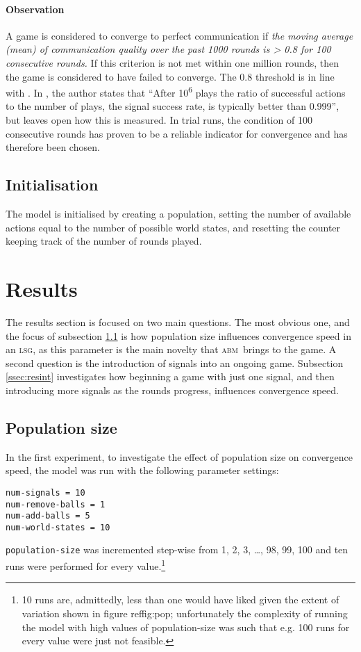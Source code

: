 \documentclass[
	DIV=calc,
	BCOR=0mm,
	pagesize,
]{scrartcl}
\newcommand{\code}[1]{\texttt{#1}}
\newcommand{\abm}{\textsc{abm}}
\newcommand{\lsg}{\textsc{lsg}}
\begin{document}
\paragraph{Observation}
A game is considered to converge to perfect communication if \emph{the moving average (mean) of communication quality over the past 1000 rounds is > 0.8 for 100 consecutive rounds.}
If this criterion is not met within one million rounds, then the game is considered to have failed to converge.
The 0.8 threshold is in line with \citet[p.~533]{barrett_numerical_2006, barrett_dynamic_2007}.
In \citet[sec.~2, unpaginated preprint]{barrett_numerical_2006}, the author states that ``After 10\textsuperscript{6} plays the ratio of successful actions to the number of plays, the signal success rate, is typically better than 0.999'', but leaves open how this is measured.
In trial runs, the condition of 100 consecutive rounds has proven to be a reliable indicator for convergence and has therefore been chosen.

\subsection{Initialisation}
\label{ssec:modini}
The model is initialised by creating a population, setting the number of available actions equal to the number of possible world states, and resetting the counter keeping track of the number of rounds played.

\section{Results}
\label{sec:res}
The results section is focused on two main questions.
The most obvious one, and the focus of subsection \ref{ssec:respop} is how population size influences convergence speed in an \lsg, as this parameter is the main novelty that \abm\ brings to the game.
A second question is the introduction of signals into an ongoing game.
Subsection \ref{ssec:resint} investigates how beginning a game with just one signal, and then introducing more signals as the rounds progress, influences convergence speed.

\subsection{Population size}
\label{ssec:respop}
In the first experiment, to investigate the effect of population size on convergence speed, the model was run with the following parameter settings:
\begin{verbatim}
num-signals = 10
num-remove-balls = 1
num-add-balls = 5
num-world-states = 10
\end{verbatim}
\code{population-size} was incremented step-wise from 1, 2, 3, \ldots, 98, 99, 100 and ten runs were performed for every value.\footnote{10 runs are, admittedly, less than one would have liked given the extent of variation shown in figure ref{fig:pop}; unfortunately the complexity of running the model with high values of population-size was such that e.g. 100 runs for every value were just not feasible.}
\end{document}
